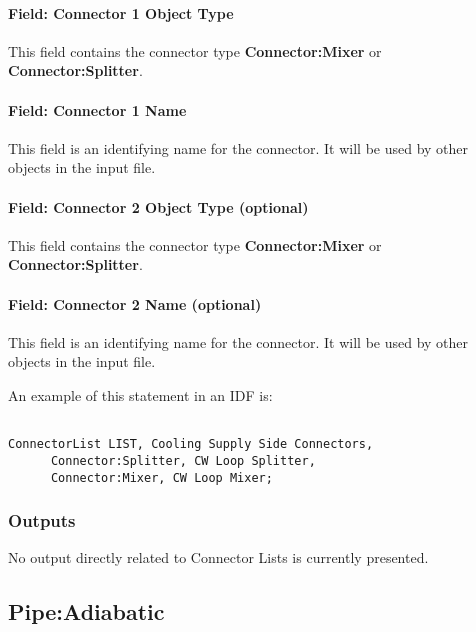 \paragraph{Field: Connector 1 Object Type}\label{field-connector-1-object-type}

This field contains the connector type \textbf{Connector:Mixer} or \textbf{Connector:Splitter}.

\paragraph{Field: Connector 1 Name}\label{field-connector-1-name}

This field is an identifying name for the connector. It will be used by other objects in the input file.

\paragraph{Field: Connector 2 Object Type (optional)}\label{field-connector-2-object-type-optional}

This field contains the connector type \textbf{Connector:Mixer} or \textbf{Connector:Splitter}.

\paragraph{Field: Connector 2 Name (optional)}\label{field-connector-2-name-optional}

This field is an identifying name for the connector. It will be used by other objects in the input file.

An example of this statement in an IDF is:

\begin{lstlisting}

ConnectorList LIST, Cooling Supply Side Connectors,
      Connector:Splitter, CW Loop Splitter,
      Connector:Mixer, CW Loop Mixer;
\end{lstlisting}

\subsubsection{Outputs}\label{outputs-3-012}

No output directly related to Connector Lists is currently presented.

\subsection{Pipe:Adiabatic}\label{pipeadiabatic}

